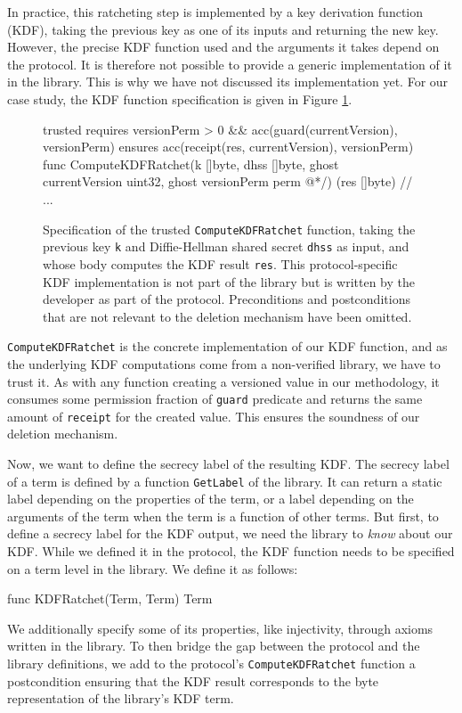 In practice, this ratcheting step is implemented by a key derivation function (KDF), taking the previous key as one of its inputs and returning the new key.
However, the precise KDF function used and the arguments it takes depend on the protocol. It is therefore not possible to provide a generic implementation of it in the library. This is why we have not discussed its implementation yet.
For our case study, the KDF function specification is given in Figure \ref{lst:kdf-ratchet}.

\begin{figure}
    \begin{gobra}
trusted
requires versionPerm > 0 && acc(guard(currentVersion), versionPerm)
ensures  acc(receipt(res, currentVersion), versionPerm)
func ComputeKDFRatchet(k []byte, dhss []byte, ghost currentVersion
    uint32, ghost versionPerm perm @*/) (res []byte) {
    // ...
}
    \end{gobra}
    \caption{Specification of the trusted \texttt{ComputeKDFRatchet} function, taking the previous key \texttt{k} and Diffie-Hellman shared secret \texttt{dhss} as input, and whose body computes the KDF result \texttt{res}. This protocol-specific KDF implementation is not part of the library but is written by the developer as part of the protocol. Preconditions and postconditions that are not relevant to the deletion mechanism have been omitted.}
    \label{lst:kdf-ratchet}
\end{figure}

\texttt{ComputeKDFRatchet} is the concrete implementation of our KDF function, and as the underlying KDF computations come from a non-verified library, we have to trust it.
As with any function creating a versioned value in our methodology, it consumes some permission fraction of \texttt{guard} predicate and returns the same amount of \texttt{receipt} for the created value. This ensures the soundness of our deletion mechanism.

Now, we want to define the secrecy label of the resulting KDF.
The secrecy label of a term is defined by a function \texttt{GetLabel} of the library. It can return a static label depending on the properties of the term, or a label depending on the arguments of the term when the term is a function of other terms. 
But first, to define a secrecy label for the KDF output, we need the library to \emph{know} about our KDF. While we defined it in the protocol, the KDF function needs to be specified on a term level in the library. We define it as follows:
\begin{gobra}
func KDFRatchet(Term, Term) Term
\end{gobra}
We additionally specify some of its properties, like injectivity, through axioms written in the library.
To then bridge the gap between the protocol and the library definitions, we add to the protocol's \texttt{ComputeKDFRatchet} function a postcondition ensuring that the KDF result corresponds to the byte representation of the library's KDF term.

